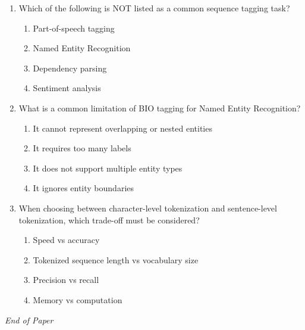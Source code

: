 \documentclass[12pt]{article}
\begin{document}
\begin{enumerate}[label=Q\arabic*.]
\begin{enumerate}[label=(\Alph*)]
\end{enumerate}
\item Which of the following is NOT listed as a common sequence tagging task?
\begin{enumerate}[label=(\Alph*)]
    \item Part-of-speech tagging
    \item Named Entity Recognition
    \item Dependency parsing
    \item Sentiment analysis
\end{enumerate}
\item What is a common limitation of BIO tagging for Named Entity Recognition?
\begin{enumerate}[label=(\Alph*)]
    \item It cannot represent overlapping or nested entities
    \item It requires too many labels
    \item It does not support multiple entity types
    \item It ignores entity boundaries
\end{enumerate}
\newpage %
\item When choosing between character-level tokenization and sentence-level tokenization, which trade-off must be considered?
\begin{enumerate}[label=(\Alph*)]
    \item Speed vs accuracy
    \item Tokenized sequence length vs vocabulary size
    \item Precision vs recall
    \item Memory vs computation
\end{enumerate}
\end{enumerate}

\vfill
\noindent\textit{End of Paper}
\end{document}
